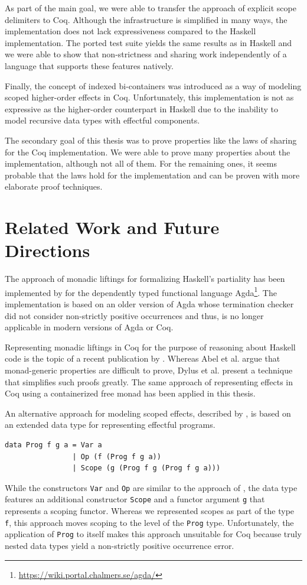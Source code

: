 \documentclass[a4paper, 11pt, fleqn, twoside, abstract=on]{scrreprt}
\newcommand{\hinl}[1]{\texttt{#1}}
\newcommand{\cinl}[1]{\texttt{#1}}
\begin{document}
As part of the main goal, we were able to transfer the approach of explicit scope delimiters to Coq.
Although the infrastructure is simplified in many ways, the implementation does not lack expressiveness compared to the Haskell implementation.
The ported test suite yields the same results as in Haskell and we were able to show that non-strictness and sharing work independently of a language that supports these features natively.

Finally, the concept of indexed bi-containers was introduced as a way of modeling scoped higher-order effects in Coq.
Unfortunately, this implementation is not as expressive as the higher-order counterpart in Haskell due to the inability to model recursive data types with effectful components.

The secondary goal of this thesis was to prove properties like the laws of sharing for the Coq implementation.
We were able to prove many properties about the implementation, although not all of them. 
For the remaining ones, it seems probable that the laws hold for the implementation and can be proven with more elaborate proof techniques.

\section{Related Work and Future Directions}

The approach of monadic liftings for formalizing Haskell's partiality has been implemented by \citet{abel2005verifying} for the dependently typed functional language Agda\footnote{\url{https://wiki.portal.chalmers.se/agda/}}.
The implementation is based on an older version of Agda whose termination checker did not consider non-strictly positive occurrences and thus, is no longer applicable in modern versions of Agda or Coq.

Representing monadic liftings in Coq for the purpose of reasoning about Haskell code is the topic of a recent publication by \citet{dylus2019oneMonad}.
Whereas Abel et al. argue that monad-generic properties are difficult to prove, Dylus et al. present a technique that simplifies such proofs greatly.
The same approach of representing effects in Coq using a containerized free monad has been applied in this thesis.

An alternative approach for modeling scoped effects, described by \citet{pirog2018syntax}, is based on an extended data type for representing effectful programs.

\begin{verbatim}
data Prog f g a = Var a
                | Op (f (Prog f g a))
                | Scope (g (Prog f g (Prog f g a)))
\end{verbatim}
\noindent
While the constructors \hinl{Var} and \hinl{Op} are similar to the approach of \citet{wu2014effect}, the data type features an additional constructor \hinl{Scope} and a functor argument \hinl{g} that represents a scoping functor.
Whereas we represented scopes as part of the type \cinl{f}, this approach moves scoping to the level of the \hinl{Prog} type.
Unfortunately, the application of \hinl{Prog} to itself makes this approach unsuitable for Coq because truly nested data types yield a non-strictly positive occurrence error.
\end{document}
